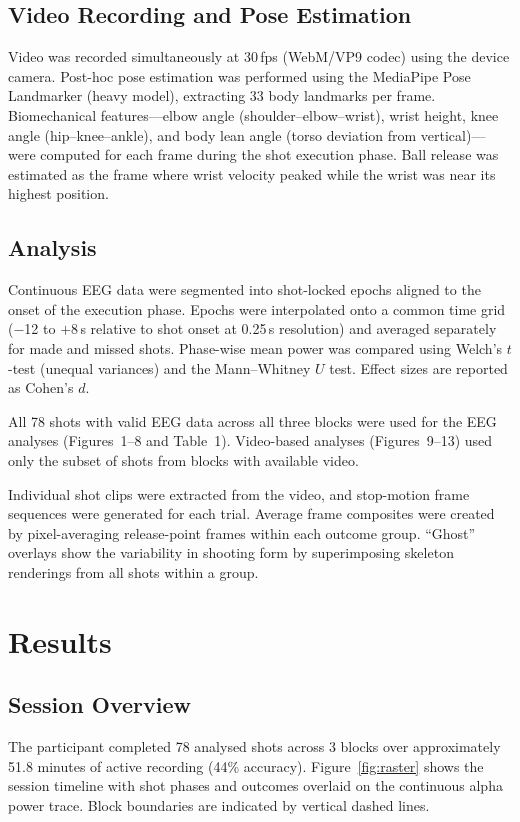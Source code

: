\documentclass[11pt,a4paper]{article}
\begin{document}
\subsection{Video Recording and Pose Estimation}
Video was recorded simultaneously at 30\,fps (WebM/VP9 codec) using the device
camera. Post-hoc pose estimation was performed using the MediaPipe Pose
Landmarker (heavy model), extracting 33 body landmarks per frame.
Biomechanical features---elbow angle (shoulder--elbow--wrist), wrist height,
knee angle (hip--knee--ankle), and body lean angle (torso deviation from
vertical)---were computed for each frame during the shot execution phase. Ball
release was estimated as the frame where wrist velocity peaked while the wrist
was near its highest position.

\subsection{Analysis}
Continuous EEG data were segmented into shot-locked epochs aligned to the onset
of the execution phase. Epochs were interpolated onto a common time grid
($-$12 to $+$8\,s relative to shot onset at 0.25\,s resolution) and averaged
separately for made and missed shots. Phase-wise mean power was compared using
Welch's $t$-test (unequal variances) and the Mann--Whitney $U$ test. Effect
sizes are reported as Cohen's $d$.

All 78 shots with valid EEG data across all three blocks were used for
the EEG analyses (Figures~1--8 and Table~1). Video-based analyses
(Figures~9--13) used only the subset of shots from blocks with available video.

Individual shot clips were extracted from the video, and stop-motion frame
sequences were generated for each trial. Average frame composites were created
by pixel-averaging release-point frames within each outcome group. ``Ghost''
overlays show the variability in shooting form by superimposing skeleton
renderings from all shots within a group.

\section{Results}

\subsection{Session Overview}
The participant completed 78 analysed shots across 3 blocks
over approximately 51.8 minutes of active recording (44\%
accuracy). Figure~\ref{fig:raster} shows the session timeline with shot phases
and outcomes overlaid on the continuous alpha power trace. Block boundaries are
indicated by vertical dashed lines.
\end{document}
